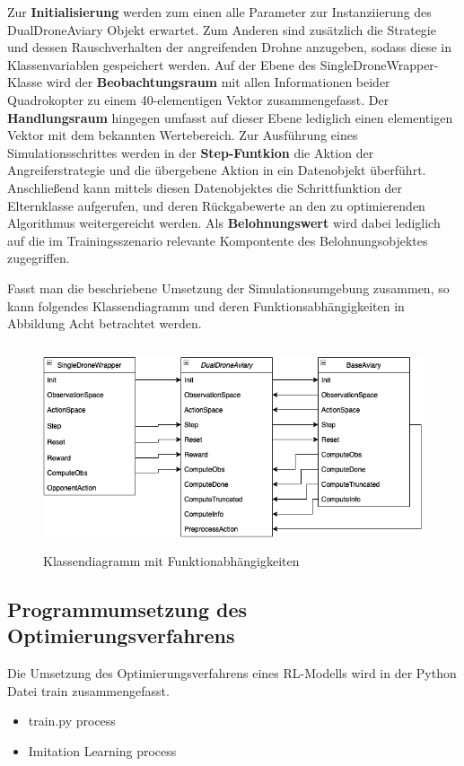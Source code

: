 Zur \textbf{Initialisierung} werden zum einen alle Parameter zur Instanziierung des DualDroneAviary Objekt erwartet.
Zum Anderen sind zusätzlich die Strategie und dessen Rauschverhalten der angreifenden Drohne anzugeben, sodass diese in Klassenvariablen gespeichert werden.
Auf der Ebene des SingleDroneWrapper-Klasse wird der \textbf{Beobachtungsraum} mit allen Informationen beider Quadrokopter zu einem 40-elementigen Vektor zusammengefasst.
Der \textbf{Handlungsraum} hingegen umfasst auf dieser Ebene lediglich einen elementigen Vektor mit dem bekannten Wertebereich.
Zur Ausführung eines Simulationsschrittes werden in der \textbf{Step-Funtkion} die Aktion der Angreiferstrategie und die übergebene Aktion in ein Datenobjekt überführt.
Anschließend kann mittels diesen Datenobjektes die Schrittfunktion der Elternklasse aufgerufen, und deren Rückgabewerte an den zu optimierenden Algorithmus weitergereicht werden.
Als \textbf{Belohnungswert} wird dabei lediglich auf die im Trainingsszenario relevante Kompontente des Belohnungsobjektes zugegriffen.

Fasst man die beschriebene Umsetzung der Simulationsumgebung zusammen, so kann folgendes Klassendiagramm und deren Funktionsabhängigkeiten in Abbildung Acht betrachtet werden.

\begin{figure}[htb]
    \centering
    \includegraphics[height=6cm]{lib/graphics/simenv structure.png}
    \caption[Klassendiagramm mit Funktionabhängigkeiten]{Klassendiagramm mit Funktionabhängigkeiten\footnotemark}
    \label{abb:drone axis}
\end{figure}

\subsection{Programmumsetzung des Optimierungsverfahrens}

Die Umsetzung des Optimierungsverfahrens eines RL-Modells wird in der Python Datei train zusammengefasst.
\begin{itemize}
    \item train.py process
    \item Imitation Learning process
\end{itemize}

